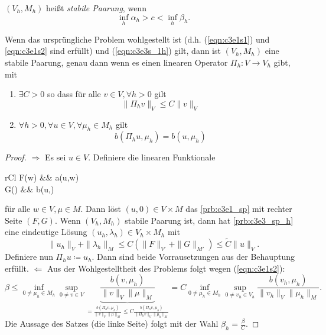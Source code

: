 \documentclass[../skript.tex]{subfiles}
\begin{document}
\begin{definition*}
	$(V_h,M_h)$ heißt \emph{stabile Paarung}, wenn
	\[
		\inf_h\alpha_h > c < \inf_h\beta_h.
	\]
\end{definition*}

\begin{theorem}\label{thm:c3e3s3}
	Wenn das ursprüngliche Problem wohlgestellt ist (d.h. (\ref{eqn:c3e1s1}) und \ref{eqn:c3e1s2} sind erfüllt) und (\ref{eqn:c3e3s_1h}) gilt, dann ist $(V_h,M_h)$ eine stabile Paarung, genau dann wenn es einen linearen Operator $\Pi_h:V\to V_h$ gibt, mit
	\begin{enumerate}
		\item $\exists C>0$ so dass für alle $v\in V,\forall h>0$ gilt
				\[
					\|\Pi_h v\|_V\leq C\|v\|_V
				\]
		\item $\forall h>0,\forall u\in V,\forall\mu_h\in M_h$ gilt
				\[
					b(\Pi_h u,\mu_h) = b(u,\mu_h)
				\]
	\end{enumerate}
\end{theorem}

\begin{proof}
	\textbf{$\Rightarrow$  }
	Es sei $u\in V$. Definiere die linearen Funktionale 
	\begin{IEEEeqnarray*}{rCl}
		F(w) &\coloneqq& a(u,w) \\
		G(\mu) &\coloneqq& b(u,\mu)
	\end{IEEEeqnarray*}
	für alle $w\in V,\mu\in M$. Dann löst $(u,0)\in V\times M$ das \cref{prb:c3e1_sp} mit rechter Seite $(F,G)$. Wenn $(V_h,M_h)$ stabile Paarung ist, dann hat \cref{prb:c3e3_sp_h} eine eindeutige Lösung $(u_h,\lambda_h)\in V_h\times M_h$ mit
	\[
		\|u_h\|_{V} + \|\lambda_h\|_{M}\leq C\left( \|F\|_{V'} + \|G\|_{M'} \right) \leq \tilde{C}\|u\|_V.
	\]
	Definiere nun
	$\Pi_h u\coloneqq u_h$. Dann sind beide Vorrausetzungen aus der Behauptung erfüllt.\newline\newline\noindent
	\textbf{$\Leftarrow$  } Aus der Wohlgestelltheit des Problems folgt wegen (\ref{eqn:c3e1s2}):
	\[
		\beta \leq \inf_{0\not=\mu_h\in M_h}\sup_{0\not=v\in V}\underbrace{\frac{b(v,\mu_h)}{\|v\|_V\|\mu\|_M}}_{=\frac{b(\Pi_hv,\mu_h)}{\|v\|_V\|\mu\|_M} \leq C\frac{b(\Pi_h v,\mu_h)}{\|\Pi_h v\|_V\|\mu_h\|_M}}
		=  C\inf_{0\not=\mu_h\in M_h}\sup_{0\not=v_h\in V_h} \frac{b(v_h,\mu_h)}{\|v_h\|_V\|\mu_h\|_M}.
	\]
	Die Aussage des Satzes (die linke Seite) folgt mit der Wahl $\beta_h = \frac{\beta}{C}$.
\end{proof}
\end{document}

